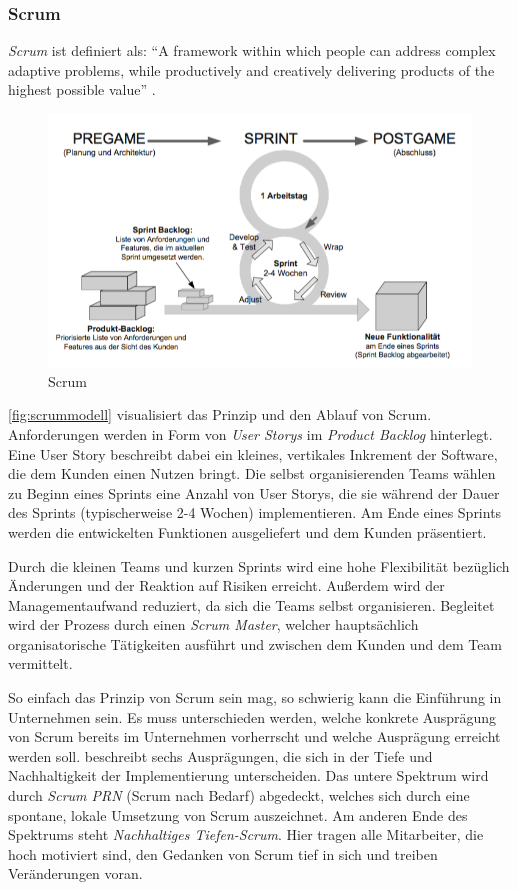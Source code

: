 \subsubsection{Scrum}

\emph{Scrum} ist definiert als:
\enquote{A framework within which people can address complex adaptive problems, while productively and creatively delivering products of the highest possible value}
\parencite[][S. 3]{schwaber2011scrum}.

\begin{figure}
  \centering
  \includegraphics[width=\textwidth]{img/scrummodell.png}
  \caption{Scrum \parencite[][S. 63]{Schatten:2010aa}}
  \label{fig:scrummodell}
\end{figure}

\autoref{fig:scrummodell} visualisiert das Prinzip und den Ablauf von Scrum.
Anforderungen werden in Form von \emph{User Storys} im \emph{Product Backlog} hinterlegt.
Eine User Story beschreibt dabei ein kleines, vertikales Inkrement der Software, die dem Kunden einen Nutzen bringt.
Die selbst organisierenden Teams wählen zu Beginn eines Sprints eine Anzahl von User Storys, die sie während der Dauer des Sprints (typischerweise 2-4 Wochen) implementieren.
Am Ende eines Sprints werden die entwickelten Funktionen ausgeliefert und dem Kunden präsentiert.

Durch die kleinen Teams und kurzen Sprints wird eine hohe Flexibilität bezüglich Änderungen und der Reaktion auf Risiken erreicht.
Außerdem wird der Managementaufwand reduziert, da sich die Teams selbst organisieren.
Begleitet wird der Prozess durch einen \emph{Scrum Master}, welcher hauptsächlich organisatorische Tätigkeiten ausführt und zwischen dem Kunden und dem Team vermittelt.

So einfach das Prinzip von Scrum sein mag, so schwierig kann die Einführung in Unternehmen sein.
Es muss unterschieden werden, welche konkrete Ausprägung von Scrum bereits im Unternehmen vorherrscht und welche Ausprägung erreicht werden soll.
\parencite[][S. 8]{maximini2012scrum} beschreibt sechs Ausprägungen, die sich in der Tiefe und Nachhaltigkeit der Implementierung unterscheiden.
Das untere Spektrum wird durch \emph{Scrum PRN} (Scrum nach Bedarf) abgedeckt, welches sich durch eine spontane, lokale Umsetzung von Scrum auszeichnet.
Am anderen Ende des Spektrums steht \emph{Nachhaltiges Tiefen-Scrum}.
Hier tragen alle Mitarbeiter, die hoch motiviert sind, den Gedanken von Scrum tief in sich und treiben Veränderungen voran.

